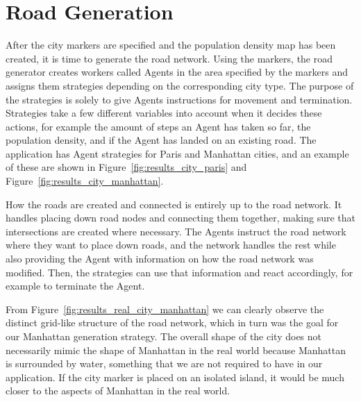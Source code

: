\section{Road Generation}

After the city markers are specified and the population density map has been created, it is time to generate the road network.
Using the markers, the road generator creates workers called Agents in the area specified by the markers and assigns them strategies depending on the corresponding city type.
The purpose of the strategies is solely to give Agents instructions for movement and termination.
Strategies take a few different variables into account when it decides these actions, for example the amount of steps an Agent has taken so far, the population density, and if the Agent has landed on an existing road.
The application has Agent strategies for Paris and Manhattan cities, and an example of these are shown in Figure~\ref{fig:results_city_paris} and Figure~\ref{fig:results_city_manhattan}.

How the roads are created and connected is entirely up to the road network.
It handles placing down road nodes and connecting them together, making sure that intersections are created where necessary.
The Agents instruct the road network where they want to place down roads, and the network handles the rest while also providing the Agent with information on how the road network was modified.
Then, the strategies can use that information and react accordingly, for example to terminate the Agent.

From Figure~\ref{fig:results_real_city_manhattan} we can clearly observe the distinct grid-like structure of the road network, which in turn was the goal for our Manhattan generation strategy.
The overall shape of the city does not necessarily mimic the shape of Manhattan in the real world because Manhattan is surrounded by water, something that we are not required to have in our application.
If the city marker is placed on an isolated island, it would be much closer to the aspects of Manhattan in the real world.


